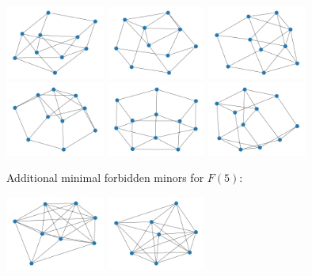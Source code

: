 \includegraphics[width=3.25cm]{images/mfms/f4_36.png}
\includegraphics[width=3.25cm]{images/mfms/f4_37.png}
\includegraphics[width=3.25cm]{images/mfms/f4_38.png}
\includegraphics[width=3.25cm]{images/mfms/f4_39.png}
\includegraphics[width=3.25cm]{images/mfms/f4_40.png}
\includegraphics[width=3.25cm]{images/mfms/f4_41.png}

\newpage
Additional minimal forbidden minors for $F(5)$: \par
\includegraphics[width=3.25cm]{images/mfms/f5_3.png}
\includegraphics[width=3.25cm]{images/mfms/f5_4.png}
